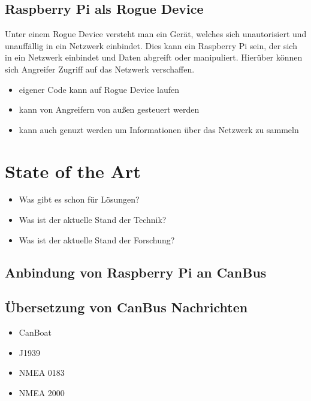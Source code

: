 \subsection{Raspberry Pi als Rogue Device}
Unter einem Rogue Device versteht man ein Gerät, welches sich unautorisiert und unauffällig in ein Netzwerk einbindet.
Dies kann ein Raspberry Pi sein, der sich in ein Netzwerk einbindet und Daten abgreift oder manipuliert. Hierüber können 
sich Angreifer Zugriff auf das Netzwerk verschaffen. 
\begin{itemize}
    \item eigener Code kann auf Rogue Device laufen
    \item kann von Angreifern von außen gesteuert werden
    \item kann auch genuzt werden um Informationen über das Netzwerk zu sammeln
\end{itemize}

\section{State of the Art}
\begin{itemize}
    \item Was gibt es schon für Lösungen?
    \item Was ist der aktuelle Stand der Technik?
    \item Was ist der aktuelle Stand der Forschung?
\end{itemize}
\subsection{Anbindung von Raspberry Pi an CanBus}
\subsection{Übersetzung von CanBus Nachrichten}
\begin{itemize}
    \item CanBoat
    \item J1939
    \item NMEA 0183
    \item NMEA 2000
\end{itemize}